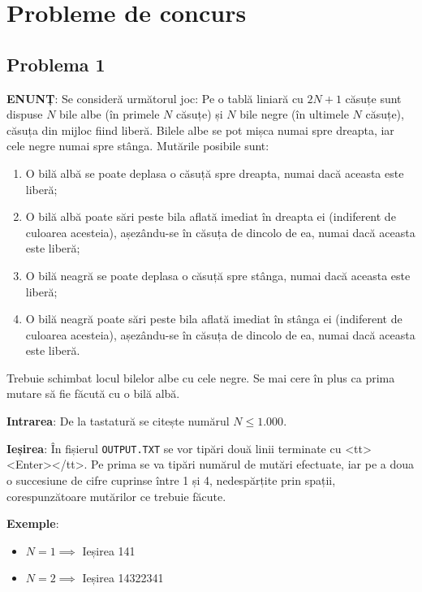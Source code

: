 \chapter{Probleme de concurs}

\section{Problema 1}

{\bf ENUNȚ}: Se consideră următorul joc: Pe o tablă liniară cu $2N+1$ căsuțe
sunt dispuse $N$ bile albe (în primele $N$ căsuțe) și $N$ bile negre (în
ultimele $N$ căsuțe), căsuța din mijloc fiind liberă. Bilele albe se pot mișca
numai spre dreapta, iar cele negre numai spre stânga. Mutările posibile sunt:

\begin{enumerate}

\item O bilă albă se poate deplasa o căsuță spre dreapta, numai dacă aceasta
  este liberă;

\item O bilă albă poate sări peste bila aflată imediat în dreapta ei
  (indiferent de culoarea acesteia), așezându-se în căsuța de dincolo de ea,
  numai dacă aceasta este liberă;

\item O bilă neagră se poate deplasa o căsuță spre stânga, numai dacă aceasta
  este liberă;

\item O bilă neagră poate sări peste bila aflată imediat în stânga ei
  (indiferent de culoarea acesteia), așezându-se în căsuța de dincolo de ea,
  numai dacă aceasta este liberă.

\end{enumerate}

Trebuie schimbat locul bilelor albe cu cele negre. Se mai cere în plus ca
prima mutare să fie făcută cu o bilă albă.

{\bf Intrarea}: De la tastatură se citește numărul $N \leq 1.000$.

{\bf Ieșirea}: În fișierul {\tt OUTPUT.TXT} se vor tipări două linii terminate
cu <tt><Enter></tt>. Pe prima se va tipări numărul de mutări efectuate, iar pe
a doua o succesiune de cifre cuprinse între 1 și 4, nedespărțite prin spații,
corespunzătoare mutărilor ce trebuie făcute.

{\bf Exemple}:

\begin{itemize}

\item $N=1 \implies$ Ieșirea 141

\item $N=2 \implies$ Ieșirea 14322341

\end{itemize}

